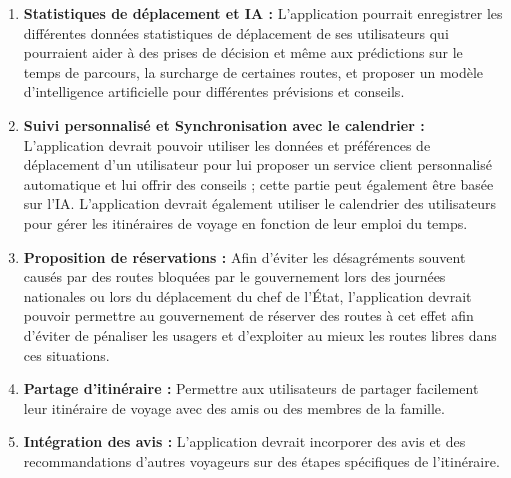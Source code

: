 \begin{enumerate}
\item \textbf{Statistiques de déplacement et IA :}
L'application pourrait enregistrer les différentes données statistiques de déplacement de ses utilisateurs qui pourraient aider à des prises de décision et même aux prédictions sur le temps de parcours, la surcharge de certaines routes, et proposer un modèle d'intelligence artificielle pour différentes prévisions et conseils.

\item \textbf{Suivi personnalisé et Synchronisation avec le calendrier :}
L'application devrait pouvoir utiliser les données et préférences de déplacement d'un utilisateur pour lui proposer un service client personnalisé automatique et lui offrir des conseils ; cette partie peut également être basée sur l'IA. L’application devrait également utiliser le calendrier des utilisateurs pour gérer les itinéraires de voyage en fonction de leur emploi du temps.

\item \textbf{Proposition de réservations :}
Afin d'éviter les désagréments souvent causés par des routes bloquées par le gouvernement lors des journées nationales ou lors du déplacement du chef de l'État, l'application devrait pouvoir permettre au gouvernement de réserver des routes à cet effet afin d'éviter de pénaliser les usagers et d'exploiter au mieux les routes libres dans ces situations.

\item \textbf{Partage d’itinéraire :}
Permettre aux utilisateurs de partager facilement leur itinéraire de voyage avec des amis ou des membres de la famille.

\item \textbf{Intégration des avis :}
L'application devrait incorporer des avis et des recommandations d'autres voyageurs sur des étapes spécifiques de l'itinéraire.
\end{enumerate}

